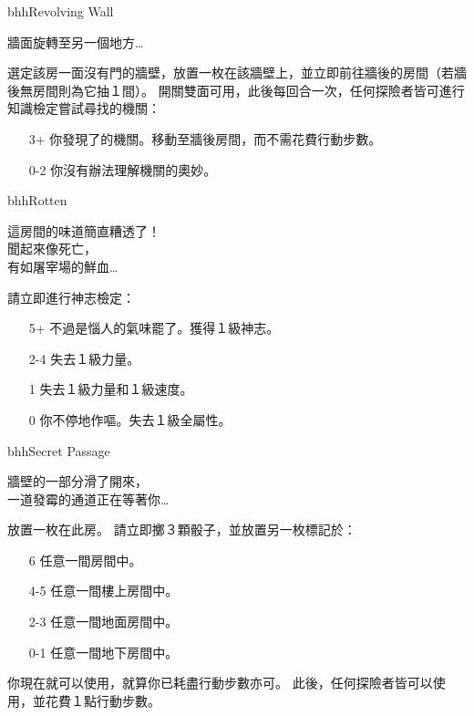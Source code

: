 \linebreak[0]%
\begin{EventCard}{bhh}{Revolving Wall}
	\begin{CardStory}
		牆面旋轉至另一個地方…
	\end{CardStory}
	選定該房一面沒有門的牆壁，放置一枚在該牆壁上，並立即前往牆後的房間（若牆後無房間則為它抽１間）。\smallbreak
	開關雙面可用，此後每回合一次，任何探險者皆可進行知識檢定嘗試尋找\ThisName{}的機關：
	\begin{itemize}
		\item[3+] 你發現了\ThisName{}的機關。移動至牆後房間，而不需花費行動步數。
		\item[0-2] 你沒有辦法理解機關的奧妙。
	\end{itemize}
\end{EventCard}%
\linebreak[0]%
\begin{EventCard}{bhh}{Rotten}
	\begin{CardStory}
		這房間的味道簡直糟透了！\\
		聞起來像死亡，\\
		有如屠宰場的鮮血…
	\end{CardStory}
	請立即進行神志檢定：
	\begin{itemize}
		\item[5+] 不過是惱人的氣味罷了。獲得１級神志。
		\item[2-4] 失去１級力量。
		\item[1] 失去１級力量和１級速度。
		\item[0] 你不停地作嘔。失去１級全屬性。
	\end{itemize}
\end{EventCard}%
\linebreak[0]%
\begin{EventCard}{bhh}{Secret Passage}
	\begin{CardStory}
		牆壁的一部分滑了開來，\\
		一道發霉的通道正在等著你…
	\end{CardStory}
	放置一枚在此房。\smallbreak
	請立即擲３顆骰子，並放置另一枚標記於：
	\begin{itemize}
		\item[6] 任意一間房間中。
		\item[4-5] 任意一間樓上房間中。
		\item[2-3] 任意一間地面房間中。
		\item[0-1] 任意一間地下房間中。
	\end{itemize}
	你現在就可以使用，就算你已耗盡行動步數亦可。\smallbreak
	此後，任何探險者皆可以使用，並花費１點行動步數。\smallbreak
\end{EventCard}%
